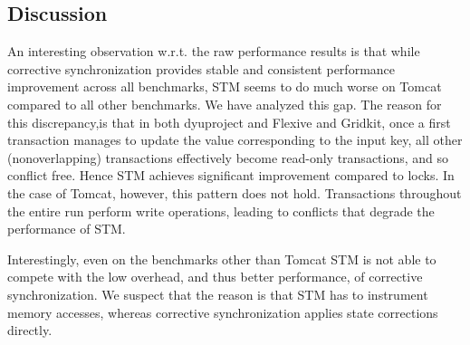 \subsection{Discussion}

An interesting observation w.r.t. the raw performance results is that while corrective synchronization provides stable and consistent performance improvement across all benchmarks, STM seems to do much worse on Tomcat compared to all other benchmarks. We have analyzed this gap.
%
The reason for this discrepancy,is that in both dyuproject and Flexive and Gridkit, once a first transaction manages to update the value corresponding to the input key, all other (nonoverlapping) transactions effectively become read-only transactions, and so conflict free. Hence STM achieves significant improvement compared to locks. In the case of Tomcat, however, this pattern does not hold. Transactions throughout the entire run perform write operations, leading to conflicts that degrade the performance of STM.

Interestingly, even on the benchmarks other than Tomcat STM is not able to compete with the low overhead, and thus better performance, of corrective synchronization. We suspect that the reason is that STM has to instrument memory accesses, whereas corrective synchronization applies state corrections directly.

